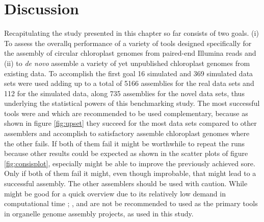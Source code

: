 \section{Discussion} \label{dis_cp}


Recapitulating the study presented in this chapter so far consists of two goals. (i) To assess the overallq
performance of a variety of tools designed specifically for the assembly of circular chloroplast genomes from
paired-end Illumina reads and (ii) to \textit{de novo} assemble a variety of yet unpublished chloroplast
genomes from existing data. To accomplish the first goal 16 simulated and 369 simulated data sets were used
adding up to a total of 5166 assemblies for the real data sets and 112 for the simulated data, along 735
assemblies for the novel data sets, thus underlying the statistical powers of this benchmarking study. The
most successful tools were \go \hspace{.5ex} and \fp \hspace{.5ex} which are recommended to be used
complementary, because as shown in figure \ref{fig:upset} they succeed for the most data sets compared to
other assemblers and accomplish to satisfactory assemble chloroplast genomes where the other fails. If both of
them fail it might be worthwhile to repeat the runs because other results could be expected as shown in the
scatter plots of figure \ref{fig:consisplot}, especially \fp might be able to improve the previously achieved
sore. Only if both of them fail it might, even though improbable, that \np might lead to a successful
assembly. The other assemblers should be used with caution. While \ce might be good for a quick overview due
to its relatively low demand in computational time \cite{freudenthal2019landscape}; \cassp, \oa and \ioga are
not be recommended to used as the primary tools in organelle genome assembly projects, as used in this study.

